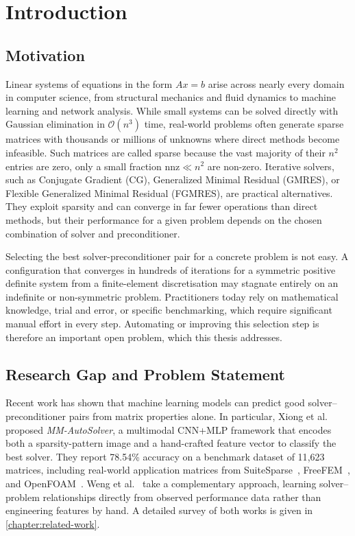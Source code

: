 
\chapter{Introduction}\label{chapter:introduction}

\section{Motivation}\label{sec:motivation}

Linear systems of equations in the form $Ax=b$ arise across nearly every domain in computer science, from structural mechanics and fluid dynamics to machine learning and network analysis.
While small systems can be solved directly with Gaussian elimination in \(\mathcal{O}(n^3)\) time, real-world problems often generate sparse matrices with thousands or millions of unknowns where direct methods become infeasible.
Such matrices are called sparse because the vast majority of their $n^2$ entries are zero, only a small fraction $\text{nnz} \ll n^2$ are non-zero.
Iterative solvers, such as Conjugate Gradient (CG), Generalized Minimal Residual (GMRES), or Flexible Generalized Minimal Residual (FGMRES), are practical alternatives.
They exploit sparsity and can converge in far fewer operations than direct methods, but their performance for a given problem depends on the chosen combination of solver and preconditioner.

Selecting the best solver-preconditioner pair for a concrete problem is not easy.
A configuration that converges in hundreds of iterations for a symmetric positive definite system from a finite-element discretisation may stagnate entirely on an indefinite or non-symmetric problem.
Practitioners today rely on mathematical knowledge, trial and error, or specific benchmarking, which require significant manual effort in every step.
Automating or improving this selection step is therefore an important open problem, which this thesis addresses.

\section{Research Gap and Problem Statement}\label{sec:research-gap}

Recent work has shown that machine learning models can predict good solver--preconditioner pairs from matrix properties alone.
In particular, Xiong et al.\ \cite{xiong2025mmautosolver} proposed \emph{MM-AutoSolver}, a multimodal CNN+MLP framework that encodes both a sparsity-pattern image and a hand-crafted feature vector to classify the best solver.
They report 78.54\% accuracy on a benchmark dataset of 11{,}623 matrices, including real-world application matrices from SuiteSparse~\cite{davis2011university}, FreeFEM~\cite{hecht2012freefem}, and OpenFOAM~\cite{weller1998tensorial}.
Weng et al.~\cite{weng2026embedding} take a complementary approach, learning solver--problem relationships directly from observed performance data rather than engineering features by hand.
A detailed survey of both works is given in \autoref{chapter:related-work}.

